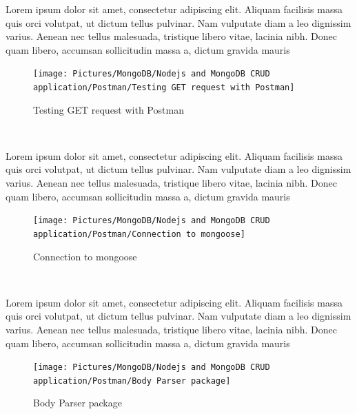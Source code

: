 \begin{spacing}{1.2}
\par Lorem ipsum dolor sit amet, consectetur adipiscing elit. Aliquam facilisis massa quis orci volutpat, ut dictum tellus pulvinar. Nam vulputate diam a leo dignissim varius. Aenean nec tellus malesuada, tristique libero vitae, lacinia nibh. Donec quam libero, accumsan sollicitudin massa a, dictum gravida mauris
\\
\begin{figure}[!htb] 
\begin{center} 
\texttt{[image: Pictures/MongoDB/Nodejs and MongoDB CRUD  application/Postman/Testing GET request with Postman]} 
\end{center} 
\caption{Testing GET request with Postman} 
\end{figure}  \FloatBarrier
\\

\par Lorem ipsum dolor sit amet, consectetur adipiscing elit. Aliquam facilisis massa quis orci volutpat, ut dictum tellus pulvinar. Nam vulputate diam a leo dignissim varius. Aenean nec tellus malesuada, tristique libero vitae, lacinia nibh. Donec quam libero, accumsan sollicitudin massa a, dictum gravida mauris
\\
\begin{figure}[!htb] 
\begin{center} 
\texttt{[image: Pictures/MongoDB/Nodejs and MongoDB CRUD  application/Postman/Connection to mongoose]} 
\end{center} 
\caption{Connection to mongoose} 
\end{figure}  \FloatBarrier
\\

\par Lorem ipsum dolor sit amet, consectetur adipiscing elit. Aliquam facilisis massa quis orci volutpat, ut dictum tellus pulvinar. Nam vulputate diam a leo dignissim varius. Aenean nec tellus malesuada, tristique libero vitae, lacinia nibh. Donec quam libero, accumsan sollicitudin massa a, dictum gravida mauris
\\
\begin{figure}[!htb] 
\begin{center} 
\texttt{[image: Pictures/MongoDB/Nodejs and MongoDB CRUD  application/Postman/Body Parser package]} 
\end{center} 
\caption{Body Parser package} 
\end{figure}  \FloatBarrier
\\

\end{spacing}
